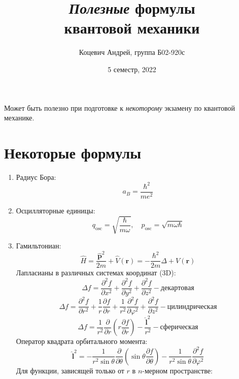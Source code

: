 \documentclass[12pt]{article}
\title{\textit{Полезные} формулы\\ квантовой механики}
\author{Коцевич Андрей, группа Б02-920с}
\date{5 семестр, 2022}
\theoremstyle{definition}
\begin{document}
\maketitle
\newpage
Может быть полезно при подготовке к \textit{некоторому} экзамену по квантовой механике.
\section{Некоторые формулы}
\begin{enumerate}
    \item Радиус Бора:
    \begin{equation}
        a_B=\frac{\hbar^2}{me^2}
    \end{equation}
    \item Осцилляторные единицы:
    \begin{equation}
        q_\text{osc}=\sqrt{\frac{\hbar}{m\omega}},\quad p_\text{osc}=\sqrt{m\omega\hbar}
    \end{equation}
    \item Гамильтониан:
    \begin{equation}
        \hat{H}=\frac{\hat{\textbf{p}}^2}{2m}+\hat{V}(\textbf{r})=-\frac{\hbar^2}{2m}\Delta+V(\textbf{r})
    \end{equation}
    Лапласианы в различных системах координат (3D):
    \begin{equation}
        \Delta f=\frac{\partial^2f}{\partial x^2}+\frac{\partial^2f}{\partial y^2}+\frac{\partial^2f}{\partial z^2} - декартовая
    \end{equation}
    \begin{equation}
        \Delta f=\frac{\partial^2f}{\partial r^2}+\frac{1}{r}\frac{\partial f}{\partial r}+\frac{1}{r^2}\frac{\partial^2f}{\partial \varphi^2}+\frac{\partial^2f}{\partial z^2} - цилиндрическая
    \end{equation}
    \begin{equation}
        \Delta f=\frac{1}{r^2}\frac{\partial}{\partial r}\left(r\frac{\partial f}{\partial r}\right)-\frac{\hat{\textbf{l}}^2}{r^2} - сферическая
    \end{equation}
    Оператор квадрата орбитального момента:
    \begin{equation}
        \hat{\textbf{l}}^2=-\frac{1}{r^2\sin\theta}\frac{\partial}{\partial\theta}\left(\sin\theta\frac{\partial f}{\partial\theta}\right)-\frac{1}{r^2\sin\theta}\frac{\partial^2f}{\partial\varphi^2}
    \end{equation}
    Для функции, зависящей только от $r$ в $n$-мерном пространстве:

\end{enumerate}
\end{document}
